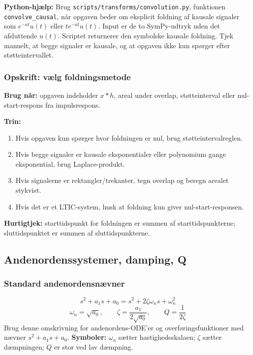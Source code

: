 \textbf{Python-hjælp:} Brug \texttt{scripts/transforms/convolution.py}, funktionen \texttt{convolve\_causal}, når opgaven beder om eksplicit foldning af kausale signaler som \(e^{-at}u(t)\) eller \(t e^{-at}u(t)\). Input er de to SymPy-udtryk uden det afsluttende \(u(t)\). Scriptet returnerer den symbolske kausale foldning. Tjek manuelt, at begge signaler er kausale, og at opgaven ikke kun spørger efter støtteintervallet.

\subsubsection{Opskrift: vælg foldningsmetode}
\textbf{Brug når:} opgaven indeholder \(x*h\), areal under overlap, støtteinterval eller nul-start-respons fra impulsrespons.

\textbf{Trin:}
\begin{enumerate}
    \item Hvis opgaven kun spørger hvor foldningen er nul, brug støtteintervalreglen.
    \item Hvis begge signaler er kausale eksponentialer eller polynomium gange eksponential, brug Laplace-produkt.
    \item Hvis signalerne er rektangler/trekanter, tegn overlap og beregn arealet stykvist.
    \item Hvis det er et LTIC-system, husk at foldning kun giver nul-start-responsen.
\end{enumerate}

\textbf{Hurtigtjek:} starttidspunkt for foldningen er summen af starttidspunkterne; sluttidspunktet er summen af sluttidspunkterne.

\subsection{Andenordenssystemer, damping, Q}

\subsubsection{Standard andenordensnævner}
\[
s^2+a_1s+a_0=s^2+2\zeta\omega_n s+\omega_n^2
\]
\[
\omega_n=\sqrt{a_0},\qquad
\zeta=\frac{a_1}{2\sqrt{a_0}},\qquad
Q=\frac{1}{2\zeta}
\]
Brug denne omskrivning for andenordens-ODE'er og overføringsfunktioner med nævner \(s^2+a_1s+a_0\).
\textbf{Symboler:} \(\omega_n\) sætter hastighedsskalaen; \(\zeta\) sætter dæmpningen; \(Q\) er stor ved lav dæmpning.

